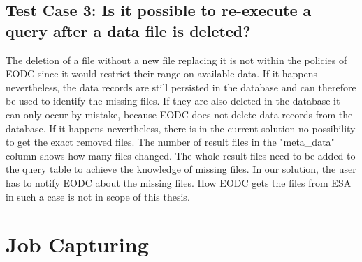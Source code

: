 \documentclass[draft,final]{vutinfth} %
\newcommand{\bgoesswein}[1]{#1}
\begin{document}
\subsection{Test Case 3: Is it possible to re-execute a query after a data file is deleted?}
The deletion of a file without a new file replacing it is not within the policies of EODC since it would restrict their range on available data. If it happens nevertheless, \bgoesswein{the data records are still persisted in the database and can therefore be used to identify the missing files. If they are also deleted in the database it can only occur by mistake, because EODC does not delete data records from the database. If it happens nevertheless,} there is in the current solution no possibility to get the exact removed files. The number of result files in the "meta\_data" column shows how many files changed. The whole result files need to be added to the query table to achieve the knowledge of missing files. In our solution, the user has to notify EODC about the missing files. How EODC gets the files from ESA in such a case is not in scope of this thesis. 




\section{Job Capturing}\label{Evaluation:special_jobcap}
\end{document}
